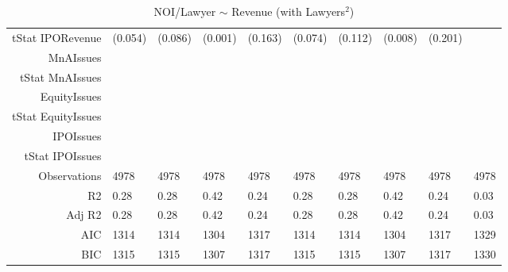 \begin{table}[ht]
\begin{tabular}{rlllllllll}
  tStat IPORevenue & (0.054) & (0.086) & (0.001) & (0.163) & (0.074) & (0.112) & (0.008) & (0.201) &  \\ 
  MnAIssues &  &  &  &  &  &  &  &  &  \\ 
  tStat MnAIssues &  &  &  &  &  &  &  &  &  \\ 
  EquityIssues &  &  &  &  &  &  &  &  &  \\ 
  tStat EquityIssues &  &  &  &  &  &  &  &  &  \\ 
  IPOIssues &  &  &  &  &  &  &  &  &  \\ 
  tStat IPOIssues &  &  &  &  &  &  &  &  &  \\ 
  Observations & 4978 & 4978 & 4978 & 4978 & 4978 & 4978 & 4978 & 4978 & 4978 \\ 
  R2 & 0.28 & 0.28 & 0.42 & 0.24 & 0.28 & 0.28 & 0.42 & 0.24 & 0.03 \\ 
  Adj R2 & 0.28 & 0.28 & 0.42 & 0.24 & 0.28 & 0.28 & 0.42 & 0.24 & 0.03 \\ 
  AIC & 1314 & 1314 & 1304 & 1317 & 1314 & 1314 & 1304 & 1317 & 1329 \\ 
  BIC & 1315 & 1315 & 1307 & 1317 & 1315 & 1315 & 1307 & 1317 & 1330 \\ 
   \hline
\end{tabular}
\caption{NOI/Lawyer $\sim$ Revenue (with Lawyers$^2$)} 
\end{table}
